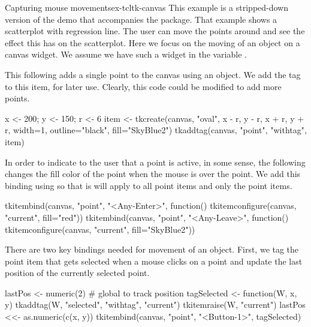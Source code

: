 \begin{example}{Capturing mouse movements}{ex-tcltk-canvas}
This example is a stripped-down version of the  demo
that accompanies the  package. That example shows a
scatterplot with regression line. The user can move the points around
and see the effect this has on the scatterplot. Here we focus on the
moving of an object on a canvas widget. We assume we have such a
widget in the variable .


This following adds a single point to the canvas using an
 object. We add the  tag to this item, for
later use. Clearly, this code could be modified to add more points.
\begin{Schunk}
\begin{Sinput}
 x <- 200; y <- 150; r <- 6
 item <- tkcreate(canvas, "oval", x - r, y - r, x + r, y + r,
                  width=1, outline="black",
                  fill="SkyBlue2")
 tkaddtag(canvas, "point", "withtag", item)
\end{Sinput}
\end{Schunk}

In order to indicate to the user that a point is active, in some
sense, the following changes the fill color of the point when the
mouse is over the point.  We add this binding using 
so that is will apply to all point items and only the point items.
\begin{Schunk}
\begin{Sinput}
 tkitembind(canvas, "point", "<Any-Enter>", function()
            tkitemconfigure(canvas, "current", fill="red"))
 tkitembind(canvas, "point", "<Any-Leave>", function()
            tkitemconfigure(canvas, "current", fill="SkyBlue2"))
\end{Sinput}
\end{Schunk}

There are two key bindings needed for movement of an object. First, we
tag the point item that gets selected when a mouse clicks on a point
and update the last position of the currently selected point.
\begin{Schunk}
\begin{Sinput}
 lastPos <- numeric(2)                   # global to track position
 tagSelected <- function(W, x, y) {
   tkaddtag(W,  "selected",  "withtag",  "current")
   tkitemraise(W, "current")
   lastPos <<- as.numeric(c(x, y))
 }
 tkitembind(canvas, "point", "<Button-1>",  tagSelected)
\end{Sinput}
\end{Schunk}


\end{example}
